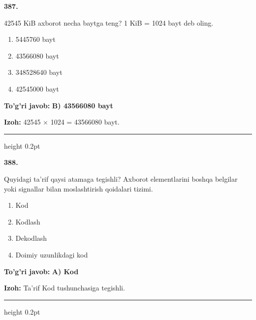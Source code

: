 \documentclass[10pt,a4paper,oneside]{article}
\begin{document}
\noindent\textbf{\color{ink}387.}
\par
42545 KiB axborot necha baytga teng? 1 KiB = 1024 bayt deb oling.
\begin{enumerate}[label=\Alph*),leftmargin=9mm]
\item 5445760 bayt
\item 43566080 bayt
\item 348528640 bayt
\item 42545000 bayt
\end{enumerate}
\begin{tcolorbox}[enhanced,breakable,colback=teal!4,colframe=teal!50!black,boxrule=0.5pt,arc=1.1mm,left=3mm,right=3mm,top=1.7mm,bottom=1.7mm,before skip=2mm,after skip=2mm]
\textbf{\color{teal}To'g'ri javob:} \textbf{B) 43566080 bayt}
\par\smallskip
\textbf{Izoh:} 42545 \ensuremath{\times} 1024 = 43566080 bayt.
\end{tcolorbox}
\vspace{2mm}\hrule height 0.2pt \vspace{3mm}

\noindent\textbf{\color{ink}388.}
\par
Quyidagi ta'rif qaysi atamaga tegishli? Axborot elementlarini boshqa belgilar yoki signallar bilan moslashtirish qoidalari tizimi.
\begin{enumerate}[label=\Alph*),leftmargin=9mm]
\item Kod
\item Kodlash
\item Dekodlash
\item Doimiy uzunlikdagi kod
\end{enumerate}
\begin{tcolorbox}[enhanced,breakable,colback=teal!4,colframe=teal!50!black,boxrule=0.5pt,arc=1.1mm,left=3mm,right=3mm,top=1.7mm,bottom=1.7mm,before skip=2mm,after skip=2mm]
\textbf{\color{teal}To'g'ri javob:} \textbf{A) Kod}
\par\smallskip
\textbf{Izoh:} Ta'rif Kod tushunchasiga tegishli.
\end{tcolorbox}
\vspace{2mm}\hrule height 0.2pt \vspace{3mm}
\end{document}
